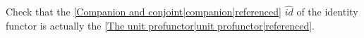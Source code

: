 
Check that the \ref{Companion and conjoint|companion|referenced} $\hat{id}$ of the identity functor is actually the \ref{The unit profunctor|unit profunctor|referenced}.